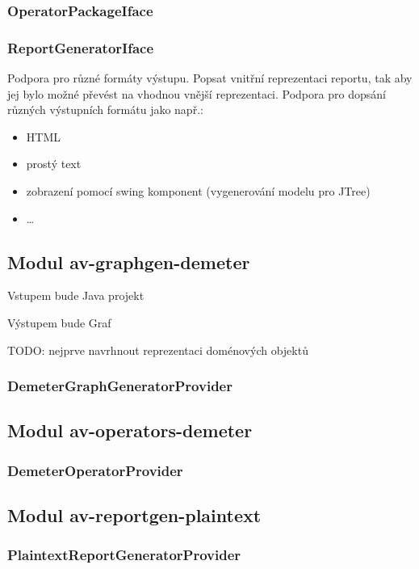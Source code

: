 \subsubsection{OperatorPackageIface}
\subsubsection{ReportGeneratorIface}
Podpora pro různé formáty výstupu. Popsat vnitřní reprezentaci reportu, tak aby jej bylo možné převést na vhodnou vnější reprezentaci. Podpora pro dopsání různých výstupních formátu jako např.:
\begin{itemize}
\item HTML
\item prostý text
\item zobrazení pomocí swing komponent (vygenerování modelu pro JTree)
\item \ldots
\end{itemize}


\subsection{Modul av-graphgen-demeter}

Vstupem bude Java projekt

Výstupem bude Graf

TODO: nejprve navrhnout reprezentaci doménových objektů

\subsubsection{DemeterGraphGeneratorProvider}

\subsection{Modul av-operators-demeter}
\subsubsection{DemeterOperatorProvider}

\subsection{Modul av-reportgen-plaintext}
\subsubsection{PlaintextReportGeneratorProvider}
